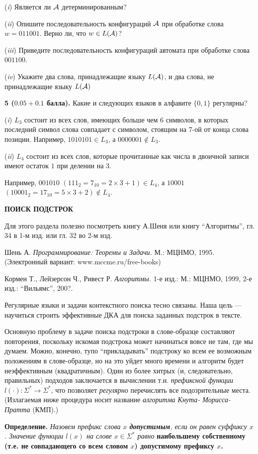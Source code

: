 \documentclass[10pt,twocolumn]{article}
\def\A{{\cal A}}
\def\ss{\Sigma^* }
\def\ra{\rightarrow}
\begin{document}
({\em i}) Является ли ${\cal A}$ детерминированным?

({\em ii}) Опишите последовательность конфигураций ${\cal A}$ при обработке
слова $w=011001$. Верно ли, что $w\in L({\cal A})$?

({\em iii}) Приведите последовательность конфигураций автомата при обработке слова
$001100$.

({\em iv})  Укажите два слова,
принадлежащие языку $L(\A)$, и два слова, не принадлежащие языку
$L(\A)$
\smallskip





{\bf 5 ($0.05+0.1$ балла).} Какие и следующих языков в алфавите $\{0,1\}$ регулярны?

({\em i}) $L_3$ состоит из всех слов, имеющих больше чем $6$ символов,
в которых последний символ слова совпадает с символом,
стоящим на $7$-ой от конца слова позиции.
Например, $1010101\in L_3$, а $0000001\notin L_3$.

({\em ii}) $L_4$ состоит из всех слов, которые прочитанные как числа в двоичной записи
имеют остаток $1$ при делении на $3$.

Например, $001010$ $(111_2=7_{10}=2\times 3+1) \in L_4$, а $10001$
$(10001_2=17_{10}=5\times 3+2) \notin L_4$.



\medskip


{\footnotesize
\centerline{\bf ПОИСК ПОДСТРОК}

\smallskip

Для этого раздела полезно посмотреть книгу А.Шеня или книгу ``Алгоритмы'', гл. 34 в 1-м изд. или гл. 32 во 2-м изд.

 Шень А.
{\em Программирование: Теоремы и Задачи.} М.: МЦНМО, 1995.
(Электронный вариант: www.mccme.ru/free-books)

Кормен Т., Лейзерсон Ч., Ривест Р. {\em Алгоритмы.} 1-е изд.: М.: МЦНМО, 1999, 2-е изд.: ``Вильямс'', 200?.

\smallskip

Регулярные языки и задачи контекстного поиска
тесно связаны. Наша цель --- научиться строить эффективные ДКА
для поиска заданных подстрок в тексте.

Основную проблему
в задаче поиска подстроки в слове-образце составляют повторения, 
поскольку искомая подстрока может начинаться вовсе не там, где мы думаем.
Можно, конечно, тупо ``прикладывать'' подстроку ко всем ее возможным
положениям в слове-образце, но на это уйдет много времени и алгоритм
будет неэффективным (квадратичным). Один из более хитрых (и, следовательно, правильных)
подходов заключается в вычислении т.н.  {\em префиксной функции}
$l(\cdot): \ss \ra \ss$, что позволяет {\em регулярно} перечислять все
подозрительные места. (Излагаемая ниже процедура носит название {\em
алгоритма Кнута- Морисса- Пратта} (КМП).)

{\bf Определение.} {\em
Назовем префикс слова $x$ {\bf допустимым}, если он равен
суффиксу $x$.
Значение функции $l(x)$ на слове $x \in \ss$ равно} 
{\bf наибольшему собственному (т.е. не совпадающего со всем словом $x$)
допустимому префиксу $x$.}}
\smallskip
\end{document}
